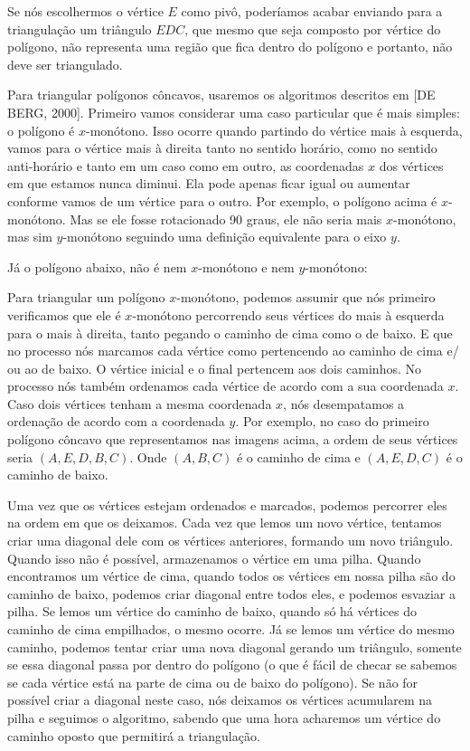 {{{{{{

Se nós escolhermos o vértice $E$ como pivô, poderíamos acabar enviando
para a triangulação um triângulo $EDC$, que mesmo que seja composto
por vértice do polígono, não representa uma região que fica dentro do
polígono e portanto, não deve ser triangulado.

Para triangular polígonos côncavos, usaremos os algoritmos descritos
em [DE BERG, 2000]. Primeiro vamos considerar uma caso particular que
é mais simples: o polígono é $x$-monótono. Isso ocorre quando partindo
do vértice mais à esquerda, vamos para o vértice mais à direita tanto
no sentido horário, como no sentido anti-horário e tanto em um caso
como em outro, as coordenadas $x$ dos vértices em que estamos nunca
diminui. Ela pode apenas ficar igual ou aumentar conforme vamos de um
vértice para o outro. Por exemplo, o polígono acima é
$x$-monótono. Mas se ele fosse rotacionado 90 graus, ele não seria
mais $x$-monótono, mas sim $y$-monótono seguindo uma definição
equivalente para o eixo $y$.

Já o polígono abaixo, não é nem $x$-monótono e nem $y$-monótono:


Para triangular um polígono $x$-monótono, podemos assumir que nós
primeiro verificamos que ele é $x$-monótono percorrendo seus vértices
do mais à esquerda para o mais à direita, tanto pegando o caminho de
cima como o de baixo. E que no processo nós marcamos cada vértice como
pertencendo ao caminho de cima e/ ou ao de baixo. O vértice inicial e
o final pertencem aos dois caminhos. No processo nós também ordenamos
cada vértice de acordo com a sua coordenada $x$. Caso dois vértices
tenham a mesma coordenada $x$, nós desempatamos a ordenação de acordo
com a coordenada $y$. Por exemplo, no caso do primeiro polígono
côncavo que representamos nas imagens acima, a ordem de seus vértices
seria $(A, E, D, B, C)$. Onde $(A, B, C)$ é o caminho de cima e $(A,
E, D, C)$ é o caminho de baixo. 

Uma vez que os vértices estejam ordenados e marcados, podemos
percorrer eles na ordem em que os deixamos. Cada vez que lemos um novo
vértice, tentamos criar uma diagonal dele com os vértices anteriores,
formando um novo triângulo. Quando isso não é possível, armazenamos o
vértice em uma pilha. Quando encontramos um vértice de cima, quando
todos os vértices em nossa pilha são do caminho de baixo, podemos
criar diagonal entre todos eles, e podemos esvaziar a pilha. Se lemos
um vértice do caminho de baixo, quando só há vértices do caminho de
cima empilhados, o mesmo ocorre. Já se lemos um vértice do mesmo
caminho, podemos tentar criar uma nova diagonal gerando um triângulo,
somente se essa diagonal passa por dentro do polígono (o que é fácil
de checar se sabemos se cada vértice está na parte de cima ou de baixo
do polígono). Se não for possível criar a diagonal neste caso, nós
deixamos os vértices acumularem na pilha e seguimos o algoritmo,
sabendo que uma hora acharemos um vértice do caminho oposto que
permitirá a triangulação.

}}}}}}
